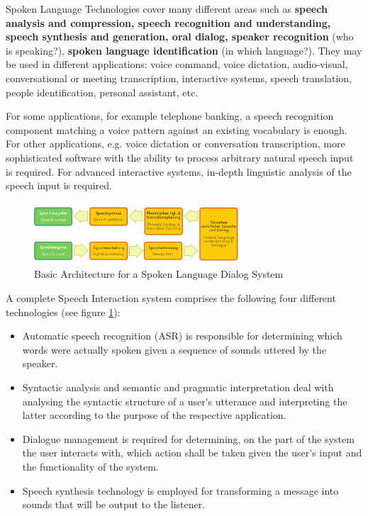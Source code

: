 \begin{multicols}{2}
Spoken Language Technologies cover many different areas such as 
{\bf speech analysis and compression, speech recognition and
  understanding, speech synthesis and generation, oral dialog, speaker
  recognition} (who is speaking?), {\bf spoken language
  identification} (in which language?). They may be used in different
applications: voice command, voice dictation, audio-visual,
conversational or meeting transcription, interactive systems, speech
translation, people identification, personal assistant, etc.

For some applications, for example telephone banking, a speech
recognition component matching a voice pattern against an existing
vocabulary is enough. For other applications, e.g. voice dictation or
conversation transcription, more sophisticated software with the
ability to process arbitrary natural speech input is required. For
advanced interactive systems, in-depth linguistic analysis of the
speech input is required.


\begin{figure}
\begin{center}
 \includegraphics[width=3.0in]{../_media/simple_speech-based_dialogue_architecture} 
\caption{Basic Architecture for a Spoken Language Dialog System}
\label{fig:sldsEng}
\end{center}
\end{figure}

A complete Speech Interaction system comprises the following four
different technologies (see figure \ref{fig:sldsEng}):
\begin{itemize}
\item Automatic speech recognition (ASR) is responsible for
  determining which words were actually spoken given a sequence of
  sounds uttered by the speaker.
\item Syntactic analysis and semantic and pragmatic interpretation
  deal with analysing the syntactic structure of a user{\mbox '}s utterance
  and interpreting the latter according to the purpose of the
  respective application.
\item Dialogue management is required for determining, on the part of
  the system the user interacts with, which action shall be taken
  given the user{\mbox '}s input and the functionality of the system.
\item Speech synthesis technology is employed for transforming a
  message into sounds that will be output to the listener.
\end{itemize}


\end{multicols}
